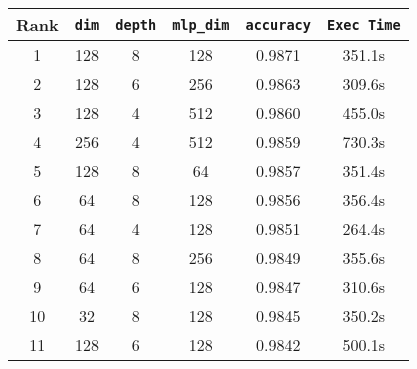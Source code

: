 \begin{table}[htbp]
  \begin{center}
    \begin{tabular}{|c|c|c|c|c|c|}
      \hline
      \textbf{Rank} & \textbf{\texttt{dim}} & \textbf{\texttt{depth}} & \textbf{\texttt{mlp\_dim}} & \textbf{\texttt{accuracy}} & \textbf{\texttt{Exec Time}} \\
      \hline
      1             & 128                   & 8                       & 128                        & 0.9871                     & 351.1s                      \\
      \hline
      2             & 128                   & 6                       & 256                        & 0.9863                     & 309.6s                      \\
      \hline
      3             & 128                   & 4                       & 512                        & 0.9860                     & 455.0s                      \\
      \hline
      4             & 256                   & 4                       & 512                        & 0.9859                     & 730.3s                      \\
      \hline
      5             & 128                   & 8                       & 64                         & 0.9857                     & 351.4s                      \\
      \hline
      6             & 64                    & 8                       & 128                        & 0.9856                     & 356.4s                      \\
      \hline
      7             & 64                    & 4                       & 128                        & 0.9851                     & 264.4s                      \\
      \hline
      8             & 64                    & 8                       & 256                        & 0.9849                     & 355.6s                      \\
      \hline
      9             & 64                    & 6                       & 128                        & 0.9847                     & 310.6s                      \\
      \hline
      10            & 32                    & 8                       & 128                        & 0.9845                     & 350.2s                      \\
      \hline
      11            & 128                   & 6                       & 128                        & 0.9842                     & 500.1s                      \\

\end{tabular}
\end{center}
\end{table}
